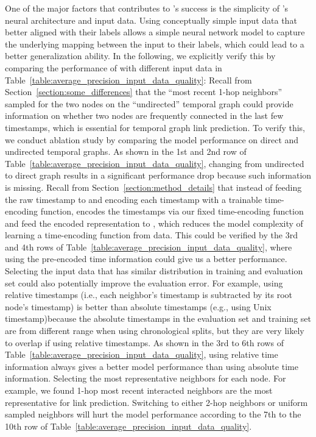 One of the major factors that contributes to \oure's success is the simplicity of \oure's neural architecture and input data.
Using conceptually simple input data that better aligned with their labels allows a simple neural network model to capture the underlying mapping between the input to their labels, which could lead to a better generalization ability.
In the following, we explicitly verify this by comparing the performance of \our with different input data in Table~\ref{table:average_precision_input_data_quality}: 
 Recall from Section~\ref{section:some_differences} that the ``most recent 1-hop neighbors'' sampled for the two nodes on the ``undirected'' temporal graph could provide information on whether two nodes are frequently connected in the last few timestamps, which is essential for temporal graph link prediction. To verify this, we conduct ablation study by comparing the model performance on direct and undirected temporal graphs. As shown in the 1st and 2nd row of Table~\ref{table:average_precision_input_data_quality},  changing from undirected to direct graph results in a significant performance drop because such information is missing.
 Recall from Section~\ref{section:method_details} that instead of feeding the raw timestamp to \our and encoding each timestamp with a trainable time-encoding function, \our encodes the timestamps via our fixed time-encoding function and feed the encoded representation to \oure, which reduces the model complexity of learning a time-encoding function from data. 
This could be verified by the 3rd and 4th rows of Table~\ref{table:average_precision_input_data_quality}, where using the pre-encoded time information could give us a better performance.
 Selecting the input data that has similar distribution in training and evaluation set could also potentially improve the evaluation error. For example, using  relative timestamps (i.e., each neighbor's timestamp is subtracted by its root node's timestamp) is better than absolute timestamps (e.g., using Unix timestamp)because the absolute timestamps in the evaluation set and training set are from different range when using chronological splits, but they are very likely to overlap if using relative timestamps.
As shown in the 3rd to 6th rows of Table~\ref{table:average_precision_input_data_quality}, using relative time information always gives a better model performance than using absolute time information.
 Selecting the most representative neighbors for each node. For example, we found 1-hop most recent interacted neighbors are the most representative for link prediction. Switching to either 2-hop neighbors or uniform sampled neighbors will hurt the model performance according to the 7th to the 10th row of Table~\ref{table:average_precision_input_data_quality}.

